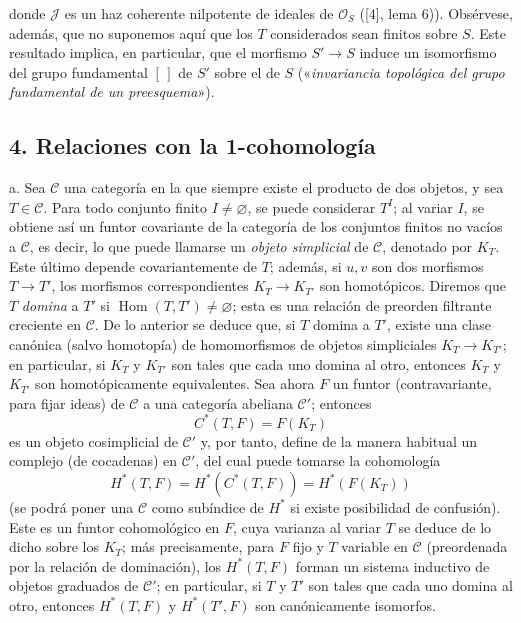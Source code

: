 donde $\mathcal J$ es un haz coherente nilpotente de ideales de $\mathcal O_S$
([4], lema 6)). Obsérvese, además, que no suponemos aquí que los $T$
considerados sean finitos sobre $S$. Este resultado implica, en particular,
que el morfismo $S'\longrightarrow S$ induce un isomorfismo del grupo
fundamental $[\,]$ de $S'$ sobre el de $S$ («\emph{invariancia topológica del
grupo fundamental de un preesquema}»).

\subsection*{4. Relaciones con la 1-cohomología}

\medskip\noindent
a. Sea $\mathcal C$ una categoría en la que siempre existe el producto de dos
objetos, y sea $T\in\mathcal C$. Para todo conjunto finito
$I\ne\varnothing$, se puede considerar $T^I$; al variar $I$, se obtiene así un
funtor covariante de la categoría de los conjuntos finitos no vacíos a
$\mathcal C$, es decir, lo que puede llamarse un \emph{objeto simplicial} de
$\mathcal C$, denotado por $K_T$. Este último depende covariantemente de $T$;
además, si $u,v$ son dos morfismos $T\longrightarrow T'$, los morfismos
correspondientes $K_T\longrightarrow K_{T'}$ son homotópicos. Diremos que $T$
\emph{domina} a $T'$ si $\operatorname{Hom}(T,T')\ne\varnothing$; esta es una
relación de preorden filtrante creciente en $\mathcal C$. De lo anterior se
deduce que, si $T$ domina a $T'$, existe una clase canónica (salvo homotopía)
de homomorfismos de objetos simpliciales $K_T\longrightarrow K_{T'}$; en
particular, si $K_T$ y $K_{T'}$ son tales que cada uno domina al otro, entonces
$K_T$ y $K_{T'}$ son homotópicamente equivalentes. Sea ahora $F$ un funtor
(contravariante, para fijar ideas) de $\mathcal C$ a una categoría abeliana
$\mathcal C'$; entonces
\[
  C^*(T,F)=F(K_T)
\]
es un objeto cosimplicial de $\mathcal C'$ y, por tanto, define de la manera
habitual un complejo (de cocadenas) en $\mathcal C'$, del cual puede tomarse la
cohomología
\[
  H^*(T,F)=H^*(C^*(T,F))=H^*(F(K_T))
\]
(se podrá poner una $\mathcal C$ como subíndice de $H^*$ si existe posibilidad
de confusión). Este es un funtor cohomológico en $F$, cuya varianza al variar
$T$ se deduce de lo dicho sobre los $K_T$; más precisamente, para $F$ fijo y
$T$ variable en $\mathcal C$ (preordenada por la relación de dominación), los
$H^*(T,F)$ forman un sistema inductivo de objetos graduados de $\mathcal C'$;
en particular, si $T$ y $T'$ son tales que cada uno domina al otro, entonces
$H^*(T,F)$ y $H^*(T',F)$ son canónicamente isomorfos.

